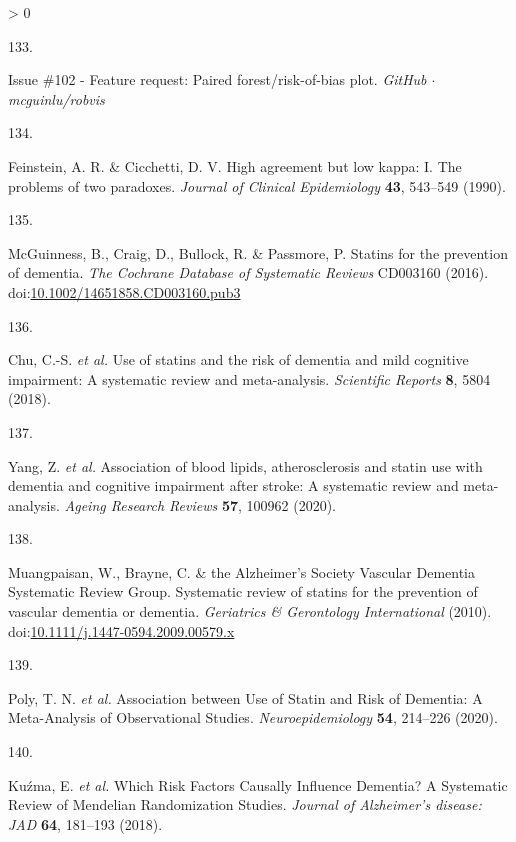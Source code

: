 \documentclass[a4paper, twoside]{templates/ociamthesis}
\newlength{\cslhangindent}
\newlength{\csllabelwidth}
\newenvironment{CSLReferences}[3] %
 {%
  \setlength{\parindent}{0pt}
  \ifodd #1 \everypar{\setlength{\hangindent}{\cslhangindent}}\ignorespaces\fi
  \ifnum #2 > 0
  \setlength{\parskip}{#2\baselineskip}
  \fi
 }%
 {}
\newcommand{\CSLLeftMargin}[1]{\parbox[t]{\maxof{\widthof{#1}}{\csllabelwidth}}{#1}}
\newcommand{\CSLRightInline}[1]{\parbox[t]{\linewidth - \csllabelwidth}{#1}}
\begin{document}
\begin{CSLReferences}{0}{0}
\leavevmode\hypertarget{ref-zotero-14999}{}%
\CSLLeftMargin{133. }
\CSLRightInline{Issue \#102 - {Feature} request: Paired forest/risk-of-bias plot. \emph{GitHub {\(\cdot\)} mcguinlu/robvis}}

\leavevmode\hypertarget{ref-feinstein1990}{}%
\CSLLeftMargin{134. }
\CSLRightInline{Feinstein, A. R. \& Cicchetti, D. V. High agreement but low kappa: {I}. {The} problems of two paradoxes. \emph{Journal of Clinical Epidemiology} \textbf{43}, 543--549 (1990).}

\leavevmode\hypertarget{ref-mcguinness2016}{}%
\CSLLeftMargin{135. }
\CSLRightInline{McGuinness, B., Craig, D., Bullock, R. \& Passmore, P. Statins for the prevention of dementia. \emph{The Cochrane Database of Systematic Reviews} CD003160 (2016). doi:\href{https://doi.org/10.1002/14651858.CD003160.pub3}{10.1002/14651858.CD003160.pub3}}

\leavevmode\hypertarget{ref-chu2018}{}%
\CSLLeftMargin{136. }
\CSLRightInline{Chu, C.-S. \emph{et al.} Use of statins and the risk of dementia and mild cognitive impairment: {A} systematic review and meta-analysis. \emph{Scientific Reports} \textbf{8}, 5804 (2018).}

\leavevmode\hypertarget{ref-yang2020}{}%
\CSLLeftMargin{137. }
\CSLRightInline{Yang, Z. \emph{et al.} Association of blood lipids, atherosclerosis and statin use with dementia and cognitive impairment after stroke: {A} systematic review and meta-analysis. \emph{Ageing Research Reviews} \textbf{57}, 100962 (2020).}

\leavevmode\hypertarget{ref-muangpaisan2010}{}%
\CSLLeftMargin{138. }
\CSLRightInline{Muangpaisan, W., Brayne, C. \& the Alzheimer's Society Vascular Dementia Systematic Review Group. Systematic review of statins for the prevention of vascular dementia or dementia. \emph{Geriatrics \& Gerontology International} (2010). doi:\href{https://doi.org/10.1111/j.1447-0594.2009.00579.x}{10.1111/j.1447-0594.2009.00579.x}}

\leavevmode\hypertarget{ref-poly2020}{}%
\CSLLeftMargin{139. }
\CSLRightInline{Poly, T. N. \emph{et al.} Association between {Use} of {Statin} and {Risk} of {Dementia}: {A Meta}-{Analysis} of {Observational Studies}. \emph{Neuroepidemiology} \textbf{54}, 214--226 (2020).}

\leavevmode\hypertarget{ref-kuzma2018a}{}%
\CSLLeftMargin{140. }
\CSLRightInline{Kuźma, E. \emph{et al.} Which {Risk Factors Causally Influence Dementia}? {A Systematic Review} of {Mendelian Randomization Studies}. \emph{Journal of Alzheimer's disease: JAD} \textbf{64}, 181--193 (2018).}


\end{CSLReferences}
\end{document}
